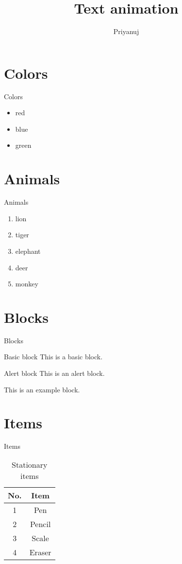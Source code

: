 \documentclass{beamer}
\title{Text animation}
\author{Priyanuj}
\date{}
\begin{document}
	\begin{frame}
		\maketitle
	\end{frame}
	
	\section{Colors}
	\begin{frame}{Colors}
		\begin{itemize}
			\item red \pause
			\item blue \pause
			\item green
		\end{itemize}
	\end{frame}

	\section{Animals}
	\begin{frame}{Animals}
		\begin{enumerate}
			\item<1-> lion
			\item<3> tiger
			\item<4-> elephant
			\item<2-> deer
			\item<5-> monkey
		\end{enumerate}
	\end{frame}

	\section{Blocks}
	\begin{frame}{Blocks}
		\begin{block}{Basic block}
			This is a basic block.
		\end{block}
		\pause
		\begin{alertblock}{Alert block}
			This is an alert block.
		\end{alertblock}
		\pause
		\begin{example}
			This is an example block.
		\end{example}
	\end{frame}

	\section{Items}
	\begin{frame}{Items}
		\begin{table}[h]
			\begin{tabular}{cc}
				\hline
				No. & Item\\
				\hline
				1 & Pen\\
				2 & Pencil\\
				3 & Scale\\
				4 & Eraser\\
				\hline
			\end{tabular}
			\caption{Stationary items}
		\end{table}
	\end{frame}
\end{document}
